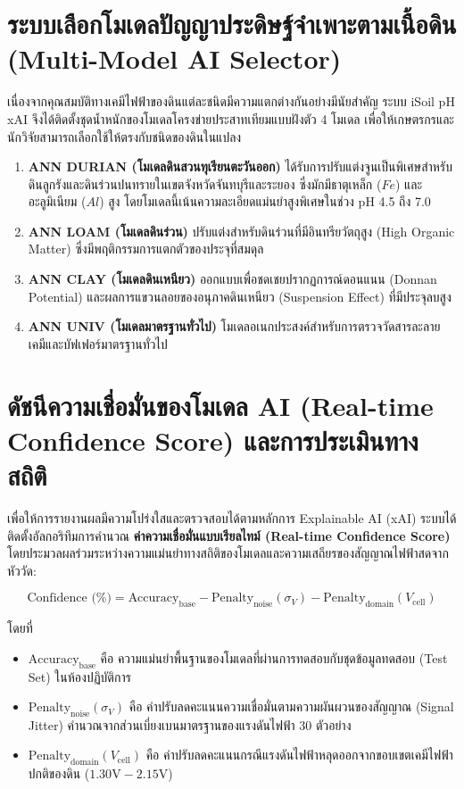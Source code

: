 \documentclass[12pt,a4paper,oneside]{report}
\begin{document}
\section{ระบบเลือกโมเดลปัญญาประดิษฐ์จำเพาะตามเนื้อดิน (Multi-Model AI Selector)}
เนื่องจากคุณสมบัติทางเคมีไฟฟ้าของดินแต่ละชนิดมีความแตกต่างกันอย่างมีนัยสำคัญ ระบบ iSoil pH xAI จึงได้ติดตั้งชุดน้ำหนักของโมเดลโครงข่ายประสาทเทียมแบบฝังตัว 4 โมเดล เพื่อให้เกษตรกรและนักวิจัยสามารถเลือกใช้ให้ตรงกับชนิดของดินในแปลง
\begin{enumerate}
    \item \textbf{ANN DURIAN (โมเดลดินสวนทุเรียนตะวันออก)} ได้รับการปรับแต่งจูนเป็นพิเศษสำหรับดินลูกรังและดินร่วนปนทรายในเขตจังหวัดจันทบุรีและระยอง ซึ่งมักมีธาตุเหล็ก ($Fe$) และอะลูมิเนียม ($Al$) สูง โดยโมเดลนี้เน้นความละเอียดแม่นยำสูงพิเศษในช่วง pH 4.5 ถึง 7.0
    \item \textbf{ANN LOAM (โมเดลดินร่วน)} ปรับแต่งสำหรับดินร่วนที่มีอินทรียวัตถุสูง (High Organic Matter) ซึ่งมีพฤติกรรมการแตกตัวของประจุที่สมดุล
    \item \textbf{ANN CLAY (โมเดลดินเหนียว)} ออกแบบเพื่อชดเชยปรากฏการณ์ดอนแนน (Donnan Potential) และผลการแขวนลอยของอนุภาคดินเหนียว (Suspension Effect) ที่มีประจุลบสูง
    \item \textbf{ANN UNIV (โมเดลมาตรฐานทั่วไป)} โมเดลอเนกประสงค์สำหรับการตรวจวัดสารละลายเคมีและบัฟเฟอร์มาตรฐานทั่วไป
\end{enumerate}

\section{ดัชนีความเชื่อมั่นของโมเดล AI (Real-time Confidence Score) และการประเมินทางสถิติ}
เพื่อให้การรายงานผลมีความโปร่งใสและตรวจสอบได้ตามหลักการ Explainable AI (xAI) ระบบได้ติดตั้งอัลกอริทึมการคำนวณ \textbf{ค่าความเชื่อมั่นแบบเรียลไทม์ (Real-time Confidence Score)} โดยประมวลผลร่วมระหว่างความแม่นยำทางสถิติของโมเดลและความเสถียรของสัญญาณไฟฟ้าสดจากหัววัด:

\begin{equation}
\text{Confidence (\%)} = \text{Accuracy}_{\text{base}} - \text{Penalty}_{\text{noise}}(\sigma_V) - \text{Penalty}_{\text{domain}}(V_{\text{cell}})
\end{equation}

โดยที่
\begin{itemize}
    \item $\text{Accuracy}_{\text{base}}$ คือ ความแม่นยำพื้นฐานของโมเดลที่ผ่านการทดสอบกับชุดข้อมูลทดสอบ (Test Set) ในห้องปฏิบัติการ
    \item $\text{Penalty}_{\text{noise}}(\sigma_V)$ คือ ค่าปรับลดคะแนนความเชื่อมั่นตามความผันผวนของสัญญาณ (Signal Jitter) คำนวณจากส่วนเบี่ยงเบนมาตรฐานของแรงดันไฟฟ้า 30 ตัวอย่าง
    \item $\text{Penalty}_{\text{domain}}(V_{\text{cell}})$ คือ ค่าปรับลดคะแนนกรณีแรงดันไฟฟ้าหลุดออกจากขอบเขตเคมีไฟฟ้าปกติของดิน ($1.30\text{V} - 2.15\text{V}$)
\end{itemize}
\end{document}
